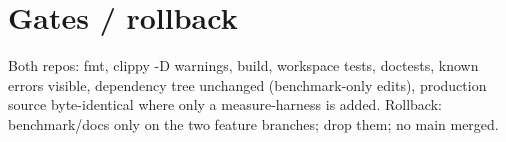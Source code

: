 \documentclass[11pt]{article}
\begin{document}
\section*{Gates / rollback}
Both repos: fmt, clippy -D warnings, build, workspace tests, doctests, known errors visible, dependency
tree unchanged (benchmark-only edits), production source byte-identical where only a measure-harness is
added. Rollback: benchmark/docs only on the two feature branches; drop them; no main merged.
\end{document}
